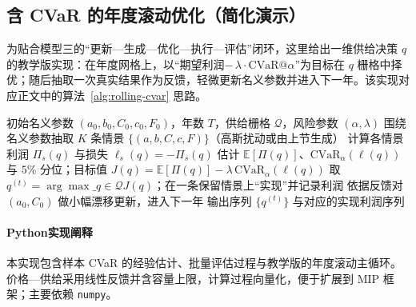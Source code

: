 \subsection{含 CVaR 的年度滚动优化（简化演示）}
为贴合模型三的“更新—生成—优化—执行—评估”闭环，这里给出一维供给决策 $q$ 的教学版实现：在年度网格上，以“期望利润$-\,\lambda\cdot\text{CVaR}@\alpha$”为目标在 $q$ 栅格中择优；随后抽取一次真实结果作为反馈，轻微更新名义参数并进入下一年。该实现对应正文中的算法~\ref{alg:rolling-cvar} 思路。
\begin{algorithm}[H]
  \caption{滚动优化 + CVaR 的年度决策流程（简化演示）}
  \label{lst:m3-rolling-cvar}
  \begin{algorithmic}[1]
    \Require 初始名义参数 $(a_0,b_0,C_0,c_0,F_0)$，年数 $T$，供给栅格 $\mathcal Q$，风险参数 $(\alpha,\lambda)$
      \State 围绕名义参数抽取 $K$ 条情景 $\{(a,b,C,c,F)\}$（高斯扰动或由上节生成）
        \State 计算各情景利润 $\Pi_s(q)$ 与损失 $\ell_s(q)=-\Pi_s(q)$
        \State 估计 $\mathbb{E}[\Pi(q)]$、$\text{CVaR}_\alpha(\ell(q))$ 与 $5\%$ 分位；目标值 $J(q)=\mathbb{E}[\Pi(q)]-\lambda\,\text{CVaR}_\alpha(\ell(q))$
      \EndFor
      \State 取 $q^{(t)}=\arg\max\_{q\in\mathcal Q} J(q)$；在一条保留情景上“实现”并记录利润
      \State 依据反馈对 $(a_0,C_0)$ 做小幅漂移更新，进入下一年
    \EndFor
    \State 输出序列 $\{q^{(t)}\}$ 与对应的实现利润序列
  \end{algorithmic}
\end{algorithm}
\paragraph{Python实现阐释}
本实现包含样本 CVaR 的经验估计、批量评估过程与教学版的年度滚动主循环。价格—供给采用线性反馈并含容量上限，计算过程向量化，便于扩展到 MIP 框架；主要依赖 \texttt{numpy}。

\newpage
\begin{center}
\begin{minipage}[t][\dimexpr\textheight-1em\relax]{0.98\linewidth}

\end{minipage}
\end{center}
